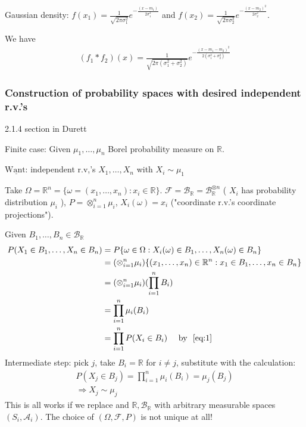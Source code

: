 \documentclass[11pt]{article}
\begin{document}
\begin{example}
    Gaussian density: $f(x_1) = \frac{1}{\sqrt{2\pi\sigma_1^{2}}}e^{-\frac{(x-m_1)}{
        2\sigma_1^{2}
    }}$ and $f(x_2) = \frac{1}{\sqrt{2\pi\sigma_2^{2}}} e^{-\frac{(x-m_2)^{2}}{2\sigma_2^{2}}}$.

    We have 
    \begin{align*}
        (f_1 * f_2)(x) = \frac{1}{\sqrt{2\pi (\sigma_1^{2} + \sigma_2^{2})}}
        e^{-\frac{(x - m_1 - m_2)^{2}}{2(\sigma_1^{2}+ \sigma_2^{2})}}
    \end{align*}
\end{example}


\subsubsection{Construction of probability spaces with desired independent r.v.'s}
2.1.4 section in Durett

Finite case: Given $\mu_1, \ldots ,\mu_n$ Borel probability measure on $\mathbb{R}$.

$\underline{\text{Want:}}$ independent r.v,'s $X_1, \ldots ,X_{n}$ with $X_{i} \sim \mu_1$

Take $\Omega = \mathbb{R}^{n} = \{ \omega = (x_1, \ldots ,x_n): x_i \in \mathbb{R} \}$.
$\mathcal{F} = \mathcal{B}_{\mathbb{R}} = \mathcal{B}_{\mathbb{R}}^{\otimes n}$ (
    $X_{i}$ has probability distribution $\mu_i$
),
$P = \otimes_{i=1}^{n}\mu_i$, $X_{i}(\omega) = x_i$ ("coordinate r.v.'s coordinate projections").

Given $B_1, \ldots ,B_n \in \mathcal{B}_{\mathbb{R}}$
\begin{align*}
    P(X_{1} \in B_1, \ldots ,X_n \in B_n) &= P\{ \omega \in \Omega: X_{i}(\omega) \in B_1, \ldots ,
    X_n(\omega) \in B_n \}\\
    &= (\otimes_{i=1}^{n}\mu_i)\{ (x_1, \ldots ,x_n) \in \mathbb{R}^{n}: x_1 \in B_1, \ldots ,
    x_n \in B_n\}\\
    &= (\otimes_{i=1}^{n}\mu_i)(\prod_{i=1}^{n}B_i )\\
    &= \prod_{i=1}^{n}\mu_i(B_i)\\
    &= \prod_{i=1}^{n} P(X_{i} \in B_i) \quad \text{ by }~\ref{eq:1}
\end{align*}
Intermediate step: pick $j$, take $B_i = \mathbb{R}$ for $i \neq j$, substitute with the calculation:
\begin{equation} \label{eq:1}
    \begin{aligned}
        P(X_{j} \in B_j) = \prod_{i=1}^{n}  \mu_i(B_i) = \mu_{j}(B_j) \\
        \Longrightarrow X_j \sim \mu_j
    \end{aligned}
\end{equation}
This is all works if we replace and $\mathbb{R}, \mathcal{B}_{\mathbb{R}}$ with arbitrary measurable
spaces $(S_i, \mathcal{A}_{i})$. The choice of $(\Omega, \mathcal{F}, P)$ is not unique at all!
\end{document}

